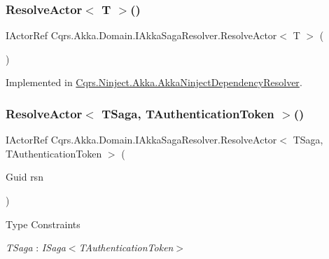 \subsubsection{\texorpdfstring{Resolve\+Actor$<$ T $>$()}{ResolveActor< T >()}}
{\footnotesize\ttfamily I\+Actor\+Ref Cqrs.\+Akka.\+Domain.\+I\+Akka\+Saga\+Resolver.\+Resolve\+Actor$<$ T $>$ (\begin{DoxyParamCaption}{ }\end{DoxyParamCaption})}



Implemented in \hyperlink{classCqrs_1_1Ninject_1_1Akka_1_1AkkaNinjectDependencyResolver_a6c3399c949a77457456d77688eb66054}{Cqrs.\+Ninject.\+Akka.\+Akka\+Ninject\+Dependency\+Resolver}.

\mbox{\label{interfaceCqrs_1_1Akka_1_1Domain_1_1IAkkaSagaResolver_ab41671bdbd0d7d83552b5e11e47fe36d}} 
\subsubsection{\texorpdfstring{Resolve\+Actor$<$ T\+Saga, T\+Authentication\+Token $>$()}{ResolveActor< TSaga, TAuthenticationToken >()}}
{\footnotesize\ttfamily I\+Actor\+Ref Cqrs.\+Akka.\+Domain.\+I\+Akka\+Saga\+Resolver.\+Resolve\+Actor$<$ T\+Saga, T\+Authentication\+Token $>$ (\begin{DoxyParamCaption}\item[{Guid}]{rsn }\end{DoxyParamCaption})}

\begin{Desc}
\item[Type Constraints]\begin{description}
\item[{\em T\+Saga} : {\em I\+Saga$<$T\+Authentication\+Token$>$}]\end{description}
\end{Desc}
